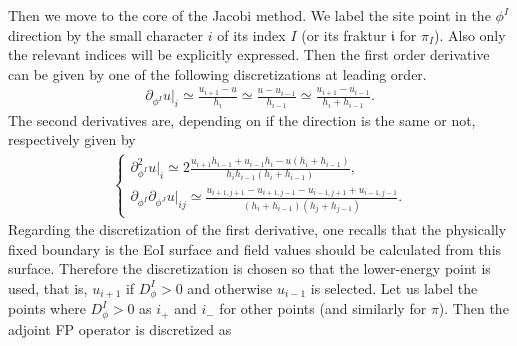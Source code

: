 \documentclass[aps, prd
, preprint
, nofootinbib 
, longbibliography
]{revtex4-1}
\newcommand{\dps}{\displaystyle}
\newcommand{\bae}[1]{\begin{align} #1 \end{align}}
\newcommand{\bce}[1]{\begin{cases} #1 \end{cases}}
\begin{document}
Then we move to the core of the Jacobi method. We label the site point in the $\phi^I$ direction by the small character $i$ of its index $I$ 
(or its fraktur $\mathfrak{i}$ for $\pi_I$). Also only the relevant indices will be explicitly expressed.
Then the first order derivative can be given by one of the following discretizations at leading order.
\bae{
	\partial_{\phi^I}u|_i\simeq\frac{u_{i+1}-u}{h_i}
	\simeq\frac{u-u_{i-1}}{h_{i-1}}
	\simeq\frac{u_{i+1}-u_{i-1}}{h_i+h_{i-1}}.
}
The second derivatives are, depending on if the direction is the same or not, respectively given by
\bae{
	 \bce{
	 	\dps
		\partial_{\phi^I}^2u|_i\simeq2\frac{u_{i+1}h_{i-1}+u_{i-1}h_i-u(h_i+h_{i-1})}{h_ih_{i-1}(h_i+h_{i-1})}, \\
		\dps
		\partial_{\phi^I}\partial_{\phi^J}u|_{ij}\simeq\frac{u_{i+1,j+1}-u_{i+1,j-1}-u_{i-1,j+1}+u_{i-1,j-1}}{(h_i+h_{i-1})(h_j+h_{j-1})}.
	}
}
Regarding the discretization of the first derivative, one recalls that the physically fixed boundary is the EoI surface and field values should be calculated 
from this surface. Therefore the discretization is chosen so that the lower-energy point is used, that is, $u_{i+1}$ if $D^I_\phi>0$ and otherwise $u_{i-1}$ is selected.
Let us label the points where $D_\phi^I>0$ as $i_+$ and $i_-$ for other points (and similarly for $\pi$). Then the adjoint FP operator is discretized as
\end{document}
